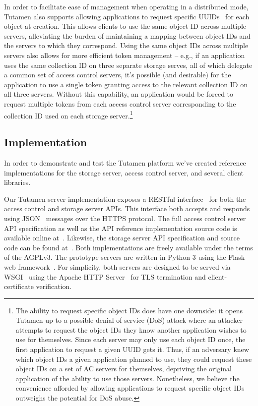 In order to facilitate ease of management when operating in a
distributed mode, Tutamen also supports allowing applications to
request specific UUIDs~\cite{leach2005} for each object at creation.
This allows clients to use the same object ID across multiple servers,
alleviating the burden of maintaining a mapping between object IDs and
the servers to which they correspond. Using the same object IDs across
multiple servers also allows for more efficient token management --
e.g., if an application uses the same collection ID on three separate
storage serves, all of which delegate a common set of access control
servers, it's possible (and desirable) for the application to use a
single token granting access to the relevant collection ID on all
three servers. Without this capability, an application would be forced
to request multiple tokens from each access control server
corresponding to the collection ID used on each storage
server.\footnote{The ability to request specific object IDs does have
  one downside: it opens Tutamen up to a possible denial-of-service
  (DoS) attack where an attacker attempts to request the object IDs
  they know another application wishes to use for themselves. Since
  each server may only use each object ID once, the first application
  to request a given UUID gets it. Thus, if an adversary knew which
  object IDs a given application planned to use, they could request
  these object IDs on a set of AC servers for themselves, depriving
  the original application of the ability to use those
  servers. Nonetheless, we believe the convenience afforded by
  allowing applications to request specific object IDs outweighs the
  potential for DoS abuse.}

\subsection{Implementation}

In order to demonstrate and test the Tutamen platform we've created
reference implementations for the storage server, access control
server, and several client libraries.

Our Tutamen server implementation exposes a RESTful
interface~\cite{fielding2000} for both the access control and storage
server APIs. This interface both accepts and responds using
JSON~\cite{json} messages over the HTTPS protocol. The full access
control server API specification as well as the API reference
implementation source code is available online
at~\cite{src-tutamen-apiaccesscontrol}. Likewise, the storage server
API specification and source code can be found
at~\cite{src-tutamen-apistorage}. Both implementations are freely
available under the terms of the AGPLv3. The prototype servers are
written in Python 3 using the Flask web
framework~\cite{python-flask}. For simplicity, both servers are
designed to be served via WSGI~\cite{pep3333} using the Apache HTTP
Server~\cite{apache} for TLS termination and client-certificate
verification.


